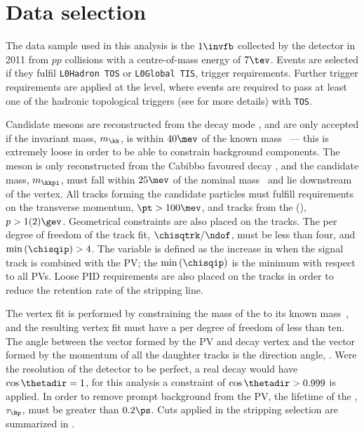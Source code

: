 \section{Data selection}
\label{sec:dsphi:sel}

%
%
%
%
%
%


The data sample used in this analysis is the
$1\invfb$ collected by the \lhcb detector in 2011 from $pp$
collisions with a centre-of-mass energy of $7\tev$.
Events are selected if they fulfil {\tt L0Hadron TOS} or {\tt L0Global TIS}, trigger requirements.
Further trigger requirements are applied at the \hlttwo level, where events are required to pass at
least one of the hadronic topological triggers (see  for more details) with {\tt TOS}.

Candidate \phii mesons are reconstructed from the decay mode \phitokk, and are only accepted if the
invariant \kk mass, $m_\kk$, is within $40\mev$ of the known \phii mass~\cite{PDG2012}
--- this is extremely loose in order to be able to constrain background components.
The \Ds meson is only reconstructed from the Cabibbo favoured decay \dstokkpi, and the candidate
mass, $m_\kkpi$, must fall within $25\mev$ of the nominal \Ds mass~\cite{PDG2012} and lie
downstream of the \Bp vertex.
All tracks forming the candidate particles must fulfill requirements on the transverse momentum,
$\pt>100\mev$, and tracks from the \Ds(\phii), $p>1(2)\gev$.
Geometrical constraints are also placed on the tracks.
The \chisq per degree of freedom of the track fit, $\chisqtrk/\ndof$, must be less than four, and
$\min\left(\chisqip\right)>4$.
The variable \chisqip is defined as the increase in \chisqvtx when the signal track is combined
with the PV; the $\min\left(\chisqip\right)$ is the minimum \chisqip with respect to all PVs.
Loose PID requirements are also placed on the tracks in order to reduce the retention rate of the
stripping line.

The \Bp vertex fit is performed by constraining the mass of the \Ds to its known
mass~\cite{PDG2012}, and the resulting vertex fit must have a \chisqvtx per degree of freedom of
less than ten.
The angle between the vector formed by the PV and \Bp decay vertex and the vector formed by the
momentum of all the daughter tracks is the direction angle, \thetadir.
Were the resolution of the \lhcb detector to be perfect, a real decay would have $\cos\thetadir=1$,
for this analysis a constraint of $\cos\thetadir>0.999$ is applied.
In order to remove prompt background from the PV, the lifetime of the \Bp, $\tau_{\Bp}$, must be
greater than $0.2\ps$.
Cuts applied in the stripping selection are summarized in .


